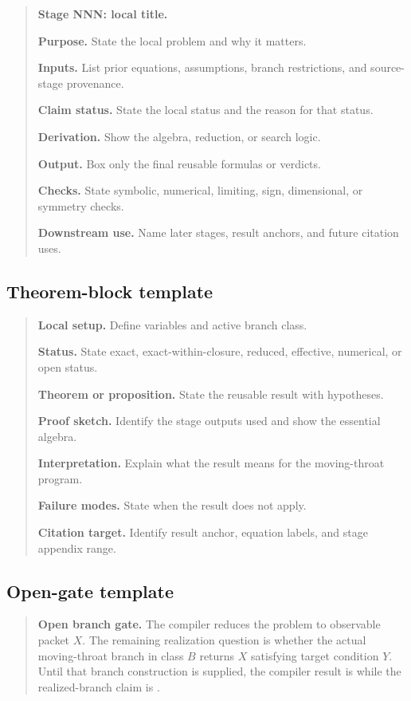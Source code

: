 \begin{quote}
\textbf{Stage NNN: local title.}

\textbf{Purpose.}  State the local problem and why it matters.

\textbf{Inputs.}  List prior equations, assumptions, branch restrictions, and source-stage provenance.

\textbf{Claim status.}  State the local status and the reason for that status.

\textbf{Derivation.}  Show the algebra, reduction, or search logic.

\textbf{Output.}  Box only the final reusable formulas or verdicts.

\textbf{Checks.}  State symbolic, numerical, limiting, sign, dimensional, or symmetry checks.

\textbf{Downstream use.}  Name later stages, result anchors, and future citation uses.
\end{quote}

\subsection{Theorem-block template}
\label{subsec:fill-theorem-template}

\begin{quote}
\textbf{Local setup.}  Define variables and active branch class.

\textbf{Status.}  State exact, exact-within-closure, reduced, effective, numerical, or open status.

\textbf{Theorem or proposition.}  State the reusable result with hypotheses.

\textbf{Proof sketch.}  Identify the stage outputs used and show the essential algebra.

\textbf{Interpretation.}  Explain what the result means for the moving-throat program.

\textbf{Failure modes.}  State when the result does not apply.

\textbf{Citation target.}  Identify result anchor, equation labels, and stage appendix range.
\end{quote}

\subsection{Open-gate template}
\label{subsec:fill-open-gate-template}

\begin{quote}
\textbf{Open branch gate.}  The compiler reduces the problem to observable packet \(X\).  The remaining realization question is whether the actual moving-throat branch in class \(B\) returns \(X\) satisfying target condition \(Y\).  Until that branch construction is supplied, the compiler result is \StatusExactClosure{} while the realized-branch claim is \StatusOpen{}.
\end{quote}

